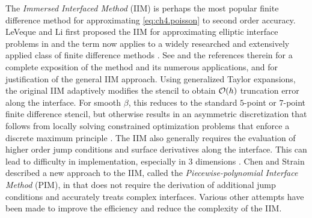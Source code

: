 The \emph{Immersed Interfaced Method} (IIM) is perhaps the most popular finite difference method for approximating \eqref{eq:ch4.poisson} to second order accuracy. LeVeque and Li first proposed the IIM for approximating elliptic interface problems in \cite{Leveque94} and the term now applies to a widely researched and extensively applied class of finite difference methods \cite{Leveque97, Li.Zhilin01b, Lee.Long03, Le.DV06, Xu.Sheng06, Tan.Zhijun08, Xu.Sheng08}. See \cite{Li.Zhilin06a} and the references therein for a complete exposition of the method and its numerous applications, and \cite{Beale06} for justification of the general IIM approach. Using generalized Taylor expansions, the original IIM adaptively modifies the stencil to obtain $\mathcal{O}(h)$ truncation error along the interface. For smooth $\beta$, this reduces to the standard $5$-point or $7$-point finite difference stencil, but otherwise results in an asymmetric discretization that follows from locally solving constrained optimization problems that enforce a discrete maximum principle \cite{Li.Zhilin01a}. The IIM also generally requires the evaluation of higher order jump conditions and surface derivatives along the interface. This can lead to difficulty in implementation, especially in $3$ dimensions \cite{Deng03, Li.Zhilin06a, Xu.Sheng06, Xu.Sheng08}. Chen and Strain described a new approach to the IIM, called the \emph{Piecewise-polynomial Interface Method} (PIM), in \cite{Chen08} that does not require the derivation of additional jump conditions and accurately treats complex interfaces. Various other attempts have been made \cite{Li.Zhilin98a, Weigmann00, Berthelsen04, Adams.Loyce02, Adams.Loyce04, Adams.Loyce05, Li.Zhilin06a} to improve the efficiency and reduce the complexity of the IIM.

